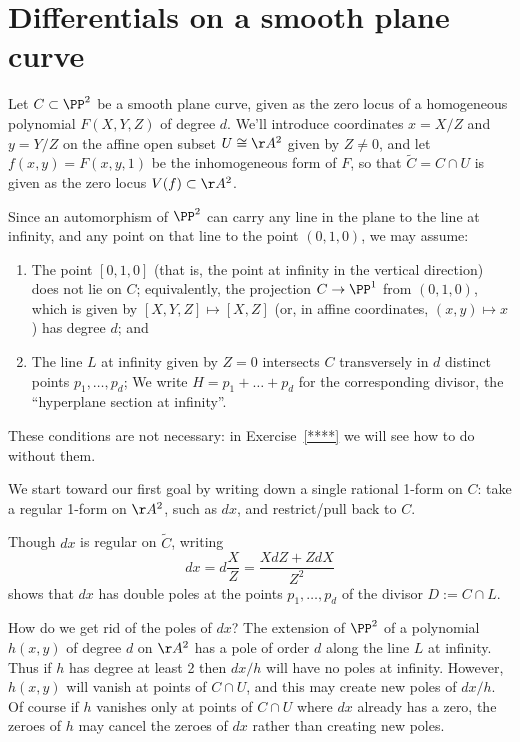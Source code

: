 \section{Differentials on a smooth plane curve}\label{canonical series on smooth plane curves}

Let $C \subset \PP^2$  be a smooth plane curve, given as the zero locus of a homogeneous polynomial $F(X,Y,Z)$ of degree $d$. We'll introduce coordinates $x = X/Z$ and $y = Y/Z$ on the affine open subset $U \cong \AA^2$ given by $Z \neq 0$, and let $f(x,y) = F(x, y,1)$ be the inhomogeneous form of $F$, so that $\widetilde C = C \cap U$ is given as the zero locus $V(f) \subset  \AA^2$. 

Since an automorphism of $\PP^2$ can carry any line in the plane to the line at infinity, and any point on that line to the point $(0,1,0)$, we may assume:
\begin{enumerate}
\item The point $[0,1,0]$ (that is, the point at infinity in the vertical direction) does not lie on $C$; equivalently,  the projection $C \to \PP^1$ from $(0,1,0)$, which is given by $[X,Y,Z] \mapsto [X,Z]$ (or, in affine coordinates, $(x,y) \mapsto x$)  has degree $d$; and
\item The line $L$ at infinity given by $Z = 0$ intersects $C$ transversely in $d$ distinct points $p_1, \dots, p_d$; We write $H = p_1+ \dots +p_d$ for the corresponding divisor, the ``hyperplane section at infinity''.
\end{enumerate}

These conditions are not necessary: in Exercise~\ref{****} we will see how to do  without them.
 
We start toward our first goal by writing down a single rational 1-form on $C$: 
 take a regular 1-form on $\AA^2$, such as $dx$, and restrict/pull back to $C$. 

Though $dx$ is regular on $\widetilde C$, writing
$$
dx = d\frac{X}{Z} = \frac{X dZ+ Z dX}{Z^2}
$$
 shows that $dx$ has double poles at the points $p_1,\dots,p_d$ of the divisor $D := C \cap L$.
 
How do we get rid of the poles of $dx$? The extension of $\PP^2$ of a polynomial $h(x,y)$ of degree $d$ on
$\AA^2$ has a pole of order $d$ along the line $L$ at infinity. Thus if $h$ has degree at least 2 then $dx/h$ will have no poles at infinity. However, $h(x,y)$ will vanish at points of $C \cap U$, and this may create new poles of $dx/h$. Of course if $h$ vanishes only at  points of $C \cap U$ where $dx$ already has a zero, the zeroes of $h$ may cancel the zeroes of $dx$ rather than creating new poles.
 
